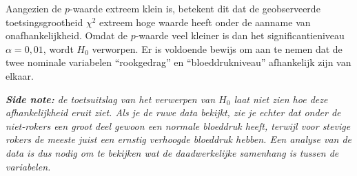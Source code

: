 {    Aangezien de $p$-waarde extreem klein is, betekent dit dat de geobserveerde toetsingsgrootheid $\chi^2$ extreem hoge waarde heeft onder de aanname van onafhankelijkheid.
    Omdat de $p$-waarde veel kleiner is dan het significantieniveau $\alpha=0,01$, wordt $H_0$  verworpen.
    Er is voldoende bewijs om aan te nemen dat de twee nominale variabelen ``rookgedrag'' en ``bloeddrukniveau'' afhankelijk zijn van elkaar.
    
    \vspace{1em}

    {
        \itshape \textbf{Side note:} de toetsuitslag van het verwerpen van $H_0$ laat niet zien hoe deze afhankelijkheid eruit ziet. Als je de ruwe data bekijkt, zie je echter dat onder de niet-rokers een groot deel gewoon een normale bloeddruk heeft, terwijl voor stevige rokers de meeste juist een ernstig verhoogde bloeddruk hebben.
        Een analyse van de data is dus nodig om te bekijken wat de daadwerkelijke samenhang is tussen de variabelen.
    }
}